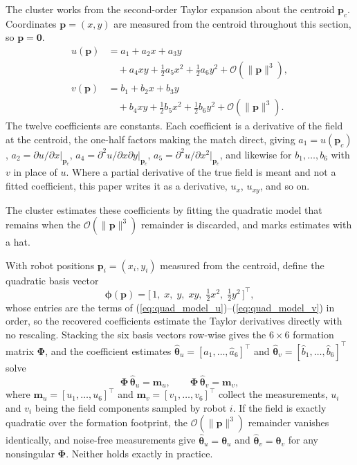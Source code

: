 \documentclass[lettersize,journal]{IEEEtran}
\begin{document}
The cluster works from the second-order Taylor expansion about the
centroid $\mathbf{p}_c$. Coordinates $\mathbf{p} = (x, y)$ are measured
from the centroid throughout this section, so $\mathbf{p} = \mathbf{0}$.
\begin{align}
    u(\mathbf{p}) &= a_1 + a_2 x + a_3 y
        \nonumber \\
        &\quad + a_4 xy + \tfrac{1}{2} a_5 x^2 + \tfrac{1}{2} a_6 y^2
        + \mathcal{O}(\|\mathbf{p}\|^3),
        \label{eq:quad_model_u} \\
    v(\mathbf{p}) &= b_1 + b_2 x + b_3 y
        \nonumber \\
        &\quad + b_4 xy + \tfrac{1}{2} b_5 x^2 + \tfrac{1}{2} b_6 y^2
        + \mathcal{O}(\|\mathbf{p}\|^3).
        \label{eq:quad_model_v}
\end{align}
The twelve coefficients are constants. Each coefficient is a derivative of the field at
the centroid, the one-half factors making the match direct,
giving $a_1 = u(\mathbf{p}_c)$, $a_2 = \partial u/\partial
x|_{\mathbf{p}_c}$, $a_4 = \partial^2 u/\partial x \partial
y|_{\mathbf{p}_c}$, $a_5 = \partial^2 u/\partial x^2|_{\mathbf{p}_c}$,
and likewise for $b_1, \ldots, b_6$ with $v$ in place of $u$. Where a
partial derivative of the true field is meant and not a fitted
coefficient, this paper writes it as a derivative, $u_x$, $u_{xy}$, and
so on.

The cluster estimates these coefficients by fitting the quadratic model
that remains when the $\mathcal{O}(\|\mathbf{p}\|^3)$ remainder is
discarded, and marks estimates with a hat.

With robot positions $\mathbf{p}_i = (x_i, y_i)$ measured from the
centroid, define the quadratic basis vector
\begin{equation}
    \boldsymbol{\phi}(\mathbf{p}) =
    \bigl[\,1, \; x, \; y, \; xy, \;
    \tfrac{1}{2}x^2, \; \tfrac{1}{2}y^2\,\bigr]^\top,
\end{equation}
whose entries are the terms of
(\ref{eq:quad_model_u})--(\ref{eq:quad_model_v}) in order, so
the recovered coefficients estimate the Taylor derivatives directly with
no rescaling. Stacking the six basis vectors row-wise gives
the $6 \times 6$ formation matrix $\boldsymbol{\Phi}$, and the coefficient
estimates $\hat{\boldsymbol{\theta}}_u = [\hat{a}_1, \ldots,
\hat{a}_6]^\top$ and $\hat{\boldsymbol{\theta}}_v = [\hat{b}_1, \ldots,
\hat{b}_6]^\top$ solve
\begin{equation}
    \boldsymbol{\Phi}\,\hat{\boldsymbol{\theta}}_u = \mathbf{m}_u, \qquad
    \boldsymbol{\Phi}\,\hat{\boldsymbol{\theta}}_v = \mathbf{m}_v,
    \label{eq:solve}
\end{equation}
where $\mathbf{m}_u = [u_1, \ldots, u_6]^\top$ and
$\mathbf{m}_v = [v_1, \ldots, v_6]^\top$ collect the measurements, $u_i$
and $v_i$ being the field components sampled by robot $i$.  If the field is exactly quadratic
over the formation footprint, the $\mathcal{O}(\|\mathbf{p}\|^3)$
remainder vanishes identically, and noise-free measurements give
$\hat{\boldsymbol{\theta}}_u = \boldsymbol{\theta}_u$ and
$\hat{\boldsymbol{\theta}}_v = \boldsymbol{\theta}_v$ for any nonsingular
$\boldsymbol{\Phi}$. Neither holds exactly in practice.
\end{document}
